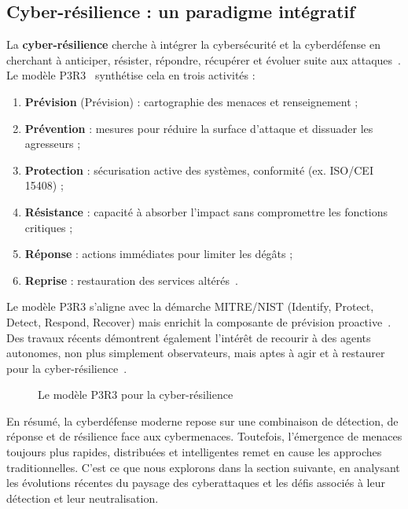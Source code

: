 \documentclass[ twoside,openright,titlepage,numbers=noenddot,headinclude,%
                footinclude=true,cleardoublepage=empty,abstractoff, %
                BCOR=5mm,paper=a4,fontsize=11pt,%
                french,american,%
                ]{scrreprt}
\begin{document}
\subsection*{Cyber-résilience : un paradigme intégratif}

La \textbf{cyber-résilience} cherche à intégrer la cybersécurité et la cyberdéfense en cherchant à anticiper, résister, répondre, récupérer et évoluer suite aux attaques~\cite{NISTresilience}. Le modèle P3R3~\cite{Theron2013P3R3} synthétise cela en trois activités :

\begin{enumerate}
    \item \textbf{Prévision} (Prévision) : cartographie des menaces et renseignement ;
    \item \textbf{Prévention} : mesures pour réduire la surface d'attaque et dissuader les agresseurs ;
    \item \textbf{Protection} : sécurisation active des systèmes, conformité (ex. ISO/CEI 15408) ;
    \item \textbf{Résistance} : capacité à absorber l'impact sans compromettre les fonctions critiques ;
    \item \textbf{Réponse} : actions immédiates pour limiter les dégâts ;
    \item \textbf{Reprise} : restauration des services altérés~\cite{Theron2013P3R3}.
\end{enumerate}

Le modèle P3R3 s'aligne avec la démarche MITRE/NIST (Identify, Protect, Detect, Respond, Recover) mais enrichit la composante de prévision proactive~\cite{Theron2013P3R3}.
Des travaux récents démontrent également l'intérêt de recourir à des agents autonomes, non plus simplement observateurs, mais aptes à agir et à restaurer pour la cyber-résilience~\cite{Kott2023}.

\begin{figure}[h]
    \centering
    \caption{Le modèle P3R3 pour la cyber-résilience}
    \label{fig:P3R3_model}
\end{figure}

\noindent
En résumé, la cyberdéfense moderne repose sur une combinaison de détection, de réponse et de résilience face aux cybermenaces. Toutefois, l'émergence de menaces toujours plus rapides, distribuées et intelligentes remet en cause les approches traditionnelles. C'est ce que nous explorons dans la section suivante, en analysant les évolutions récentes du paysage des cyberattaques et les défis associés à leur détection et leur neutralisation.
\end{document}
